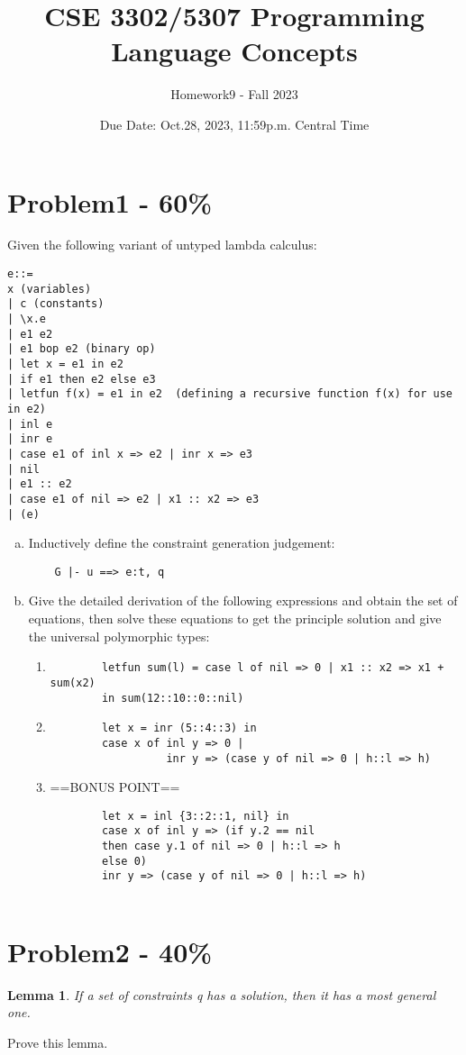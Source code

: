 \documentclass{article}
\newtheorem{lemma}[thm]{Lemma}
\begin{document}
\title{CSE 3302/5307 Programming Language Concepts}
\author{Homework9 - Fall 2023}
\date{Due Date: Oct.28, 2023, 11:59p.m. Central Time}
\maketitle
\thispagestyle{fancy}


\section*{Problem1 - 60\%}

Given the following variant of untyped lambda calculus:
\newline
\begin{verbatim}
e::=
x (variables)
| c (constants)
| \x.e
| e1 e2
| e1 bop e2 (binary op)
| let x = e1 in e2
| if e1 then e2 else e3
| letfun f(x) = e1 in e2  (defining a recursive function f(x) for use in e2)
| inl e
| inr e
| case e1 of inl x => e2 | inr x => e3
| nil
| e1 :: e2
| case e1 of nil => e2 | x1 :: x2 => e3
| (e)
\end{verbatim}

\begin{enumerate}[(a)]
	\item Inductively define the constraint generation judgement:
	\begin{verbatim}
	G |- u ==> e:t, q
	\end{verbatim}
	
	\item Give the detailed derivation of the following expressions and obtain the set of equations, then solve these equations to get the principle solution and give the universal polymorphic types:
	\begin{enumerate}[(1)]
		\item
		\begin{verbatim}
		letfun sum(l) = case l of nil => 0 | x1 :: x2 => x1 + sum(x2) 
		in sum(12::10::0::nil)
		\end{verbatim}
		\item
		\begin{verbatim}
		let x = inr (5::4::3) in 
		case x of inl y => 0 | 
		          inr y => (case y of nil => 0 | h::l => h)
		\end{verbatim}
		\item 
		==BONUS POINT==
		\begin{verbatim}
		let x = inl {3::2::1, nil} in
		case x of inl y => (if y.2 == nil 
		then case y.1 of nil => 0 | h::l => h 
		else 0)
		inr y => (case y of nil => 0 | h::l => h)
		
		\end{verbatim}
		
	\end{enumerate}
\end{enumerate}


\section*{Problem2 - 40\%}

\begin{lemma}
    If a set of constraints q has a solution, then it has a most general one.
\end{lemma}

Prove this lemma.
\end{document}
